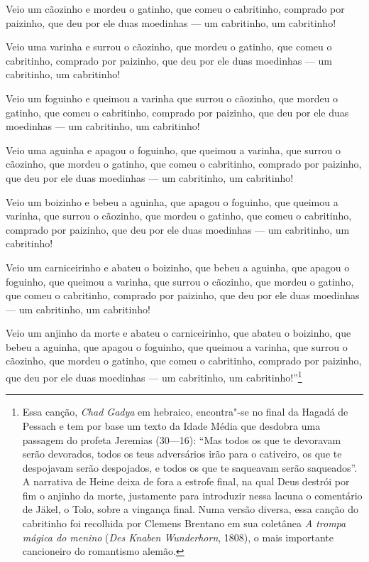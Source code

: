Veio um cãozinho e mordeu o gatinho, que comeu o cabritinho, comprado
por paizinho, que deu por ele duas moedinhas --- um cabritinho, um
cabritinho! 

Veio uma varinha e surrou o cãozinho, que mordeu o gatinho, que comeu o
cabritinho, comprado por paizinho, que deu por ele duas moedinhas --- um
cabritinho, um cabritinho! 

Veio um foguinho e queimou a varinha que surrou o cãozinho, que mordeu o
gatinho, que comeu o cabritinho, comprado por paizinho, que deu por ele
duas moedinhas --- um cabritinho, um cabritinho!

Veio uma aguinha e apagou o foguinho, que queimou a varinha, que surrou
o cãozinho, que mordeu o gatinho, que comeu o cabritinho, comprado por
paizinho, que deu por ele duas moedinhas --- um cabritinho, um
cabritinho!

Veio um boizinho e bebeu a aguinha, que apagou o foguinho, que queimou a
varinha, que surrou o cãozinho, que mordeu o gatinho, que comeu o
cabritinho, comprado por paizinho, que deu por ele duas moedinhas --- um
cabritinho, um cabritinho!

Veio um carniceirinho e abateu o boizinho, que bebeu a aguinha, que
apagou o foguinho, que queimou a varinha, que surrou o cãozinho, que
mordeu o gatinho, que comeu o cabritinho, comprado por paizinho, que
deu por ele duas moedinhas --- um cabritinho, um cabritinho!

Veio um anjinho da morte e abateu o carniceirinho, que abateu o
boizinho, que bebeu a aguinha, que apagou o foguinho, que queimou a
varinha, que surrou o cãozinho, que mordeu o gatinho, que comeu o
cabritinho, comprado por paizinho, que deu por ele duas moedinhas --- um
cabritinho, um
cabritinho!''\footnote{
Essa canção, \textit{Chad Gadya} em hebraico, encontra"-se no final da
Hagadá de Pessach e tem por base um texto da Idade Média que desdobra
uma passagem do profeta Jeremias (30---16): ``Mas todos os que te
devoravam serão devorados, todos os teus adversários irão para o
cativeiro, os que te despojavam serão despojados, e todos os que te
saqueavam serão saqueados''. A narrativa de Heine deixa de fora a
estrofe final, na qual Deus destrói por fim o anjinho da morte,
justamente para introduzir nessa lacuna o comentário de Jäkel, o Tolo,
sobre a vingança final. Numa versão diversa, essa canção do cabritinho
foi recolhida por Clemens Brentano em sua coletânea \textit{A trompa
mágica do menino} (\textit{Des Knaben Wunderhorn}, 1808), o mais
importante cancioneiro do romantismo alemão.}


